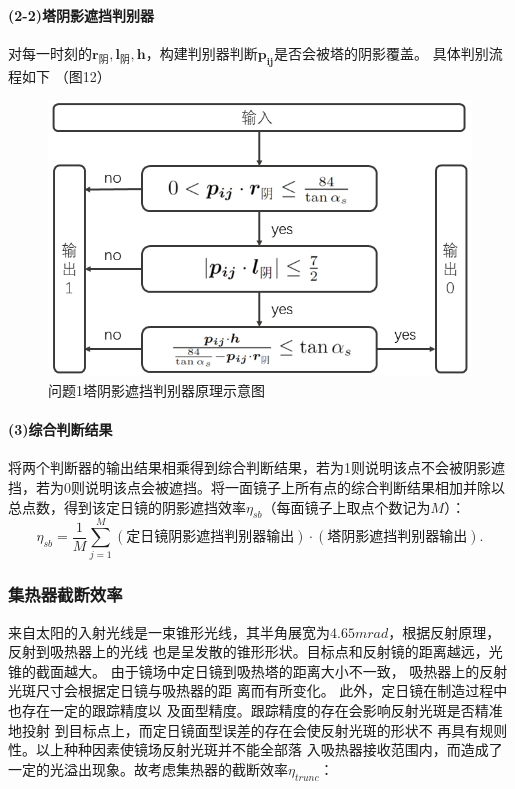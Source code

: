 \documentclass{article}
\numberwithin{equation}{subsection}
\begin{document}
\paragraph{(2-2)塔阴影遮挡判别器}
对每一时刻的$\bm{r_{\text{阴}}},\bm{l_{\text{阴}}},\bm{h}$，构建判别器判断$\bm{p_{ij}}$是否会被塔的阴影覆盖。
具体判别流程如下 （图12）
\begin{figure}[H]
    \centering
    \includegraphics[scale=0.5]{问题1-1塔阴影遮挡判别器原理.png}
    \caption{问题1塔阴影遮挡判别器原理示意图}
\end{figure}

\paragraph{(3)综合判断结果}
将两个判断器的输出结果相乘得到综合判断结果，若为1则说明该点不会被阴影遮挡，若为0则说明该点会被遮挡。将一面镜子上所有点的综合判断结果相加并除以总点数，得到该定日镜的阴影遮挡效率$\eta_{sb}$（每面镜子上取点个数记为$M$）：
\begin{equation}
    \eta_{sb}=\frac{1}{M}\sum_{j=1}^{M}\left(\text{定日镜阴影遮挡判别器输出}\right)\cdot\left(\text{塔阴影遮挡判别器输出}\right).
\end{equation}  

\subsubsection{集热器截断效率}

来自太阳的入射光线是一束锥形光线，其半角展宽为$4.65 mrad$\cite{3}，根据反射原理，反射到吸热器上的光线
也是呈发散的锥形形状。目标点和反射镜的距离越远，光锥的截面越大。
由于镜场中定日镜到吸热塔的距离大小不一致，
吸热器上的反射光斑尺寸会根据定日镜与吸热器的距
离而有所变化。
此外，定日镜在制造过程中也存在一定的跟踪精度以
及面型精度。跟踪精度的存在会影响反射光斑是否精准地投射
到目标点上，而定日镜面型误差的存在会使反射光斑的形状不
再具有规则性。\cite{3}以上种种因素使镜场反射光斑并不能全部落
入吸热器接收范围内，而造成了一定的光溢出现象。故考虑集热器的截断效率$\eta_{trunc}$：
\end{document}

